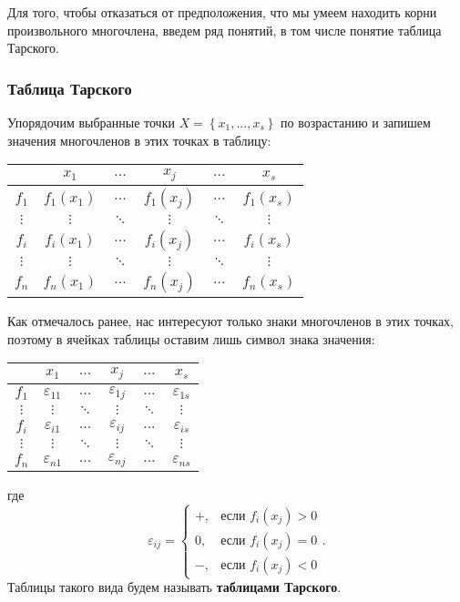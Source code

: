 Для того, чтобы отказаться от предположения, что мы умеем находить корни произвольного многочлена, введем ряд понятий, в том числе понятие таблица Тарского.

\subsubsection{Таблица Тарского}

Упорядочим выбранные точки $X = \left\{x_1, ... , x_s\right\}$ по возрастанию и запишем значения многочленов в этих точках в таблицу:
\begin{center}
    \begin{tabular}{ |c|c|c|c|c|c| } 
    \hline
                 & $x_1$ & $...$ & $x_j$ & $...$ & $x_s$ \\ 
    \hline
        $f_1$ & $f_1(x_1)$ & $...$ & $f_1(x_j)$ & $...$ & $f_1(x_s)$\\ 
    \hline
        $\vdots$ & $\vdots$ & $\ddots$ & $\vdots$ & $\ddots$ & $\vdots$ \\
    \hline
        $f_i$ & $f_i(x_1)$ & $...$ & $f_i(x_j)$ & $...$ & $f_i(x_s)$\\ 
    \hline
        $\vdots$ & $\vdots$ & $\ddots$ & $\vdots$ & $\ddots$ & $\vdots$ \\
    \hline
        $f_n$ & $f_n(x_1)$ & $...$ & $f_n(x_j)$ & $...$ & $f_n(x_s)$\\    
    \hline
    \end{tabular}
\end{center}

Как отмечалось ранее, нас интересуют только знаки многочленов в этих точках, поэтому в ячейках таблицы оставим лишь символ знака значения:
\begin{center}
    \begin{tabular}{ |c|c|c|c|c|c| } 
    \hline
                 & $x_1$ & $...$ & $x_j$ & $...$ & $x_s$ \\ 
    \hline
        $f_1$ & $\varepsilon_{11}$ & $...$ & $\varepsilon_{1j}$ & $...$ & $\varepsilon_{1s}$\\ 
    \hline
        $\vdots$ & $\vdots$ & $\ddots$ & $\vdots$ & $\ddots$ & $\vdots$ \\
    \hline
        $f_i$ & $\varepsilon_{i1}$ & $...$ & $\varepsilon_{ij}$ & $...$ & $\varepsilon_{is}$\\ 
    \hline
        $\vdots$ & $\vdots$ & $\ddots$ & $\vdots$ & $\ddots$ & $\vdots$ \\
    \hline
        $f_n$ & $\varepsilon_{n1}$ & $...$ & $\varepsilon_{nj}$ & $...$ & $\varepsilon_{ns}$\\    
    \hline
    \end{tabular}
\end{center}
где 
\begin{equation*}
    \varepsilon_{ij} = 
    \begin{cases}
        +, &\text{если $f_i(x_j) > 0$} \\
        0, &\text{если $f_i(x_j) = 0$} \\
        -, &\text{если $f_i(x_j) < 0$}
    \end{cases}.
\end{equation*}
Таблицы такого вида будем называть \textbf{таблицами Тарского}. 


